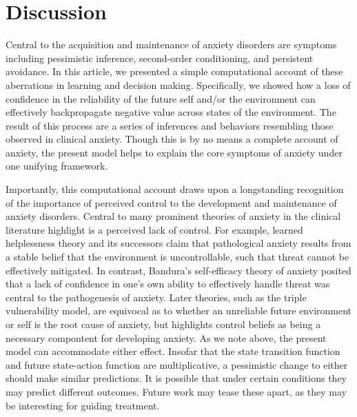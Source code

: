 \documentclass[11pt]{article} %
\begin{document}
\section{Discussion}

Central to the acquisition and maintenance of anxiety disorders are symptoms including pessimistic inference, second-order conditioning, and persistent avoidance. In this article, we presented a simple computational account of these aberrations in learning and decision making. Specifically, we showed how a loss of confidence in the reliability of the future self and/or the environment can effectively backpropagate negative value across states of the environment. The result of this process are a series of inferences and behaviors resembling those observed in clinical anxiety. Though this is by no means a complete account of anxiety, the present model helps to explain the core symptoms of anxiety under one unifying framework.

Importantly, this computational account draws upon a longstanding recognition of the importance of perceived control to the development and maintenance of anxiety disorders. Central to many prominent theories of anxiety in the clinical literature highlight is a perceived lack of control. For example, learned helplessness theory and its successors claim that pathological anxiety results from a stable belief that the environment is uncontrollable, such that threat cannot be effectively mitigated. In contrast, Bandura's self-efficacy theory of anxiety posited that a lack of confidence in one's own ability to effectively handle threat was central to the pathogenesis of anxiety. Later theories, such as the triple vulnerability model, are equivocal as to whether an unreliable future environment or self is the root cause of anxiety, but highlights control beliefs as being a necessary compontent for developing anxiety. As we note above, the present model can accommodate either effect. Insofar that the state transition function and future state-action function are multiplicative, a pessimistic change to either should make similar predictions. It is possible that under certain conditions they may predict different outcomes. Future work may tease these apart, as they may be interesting for guiding treatment.
\end{document}
